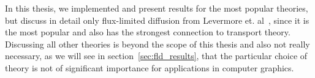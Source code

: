 In this thesis, we implemented and present results for the most popular theories, but discuss in detail only flux-limited diffusion from Levermore et. al~\cite{Levermore81}, since it is the most popular and also has the strongest connection to transport theory. Discussing all other theories is beyond the scope of this thesis and also not really necessary, as we will see in section~\ref{sec:fld_results}, that the particular choice of theory is not of significant importance for applications in computer graphics.